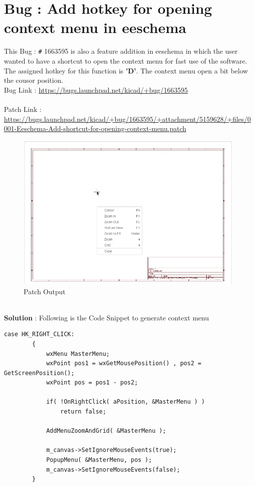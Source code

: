 \documentclass[12pt,a4paper]{report}
\begin{document}
\section{Bug : Add hotkey for opening context menu in eeschema}
This Bug : \verb!#! 1663595 is also a feature addition in eeschema in which the user wanted to have a shortcut to open the context menu for fast use of the software. The assigned hotkey for this function is \textbf{'D'}. The context menu open a bit below the cousor position.
\vspace{3mm}
\\
Bug Link : \url{https://bugs.launchpad.net/kicad/+bug/1663595}
\\
\\
Patch Link : \url{https://bugs.launchpad.net/kicad/+bug/1663595/+attachment/5159628/+files/0001-Eeschema-Add-shortcut-for-opening-context-menu.patch}
\begin{figure}[h]
	\centering
	\includegraphics[scale=0.3]{ki_bug_2}
	\caption{Patch Output}
\end{figure}
\\
\textbf{Solution} : Following is the Code Snippet to generate context menu
\begin{verbatim}
case HK_RIGHT_CLICK:
        {
            wxMenu MasterMenu;
            wxPoint pos1 = wxGetMousePosition() , pos2 = GetScreenPosition();
            wxPoint pos = pos1 - pos2;

            if( !OnRightClick( aPosition, &MasterMenu ) )
                return false;

            AddMenuZoomAndGrid( &MasterMenu );

            m_canvas->SetIgnoreMouseEvents(true);
            PopupMenu( &MasterMenu, pos );
            m_canvas->SetIgnoreMouseEvents(false);
        }
\end{verbatim}
\end{document}
